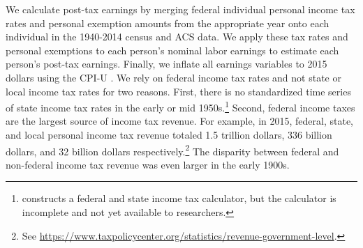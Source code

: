 \documentclass[12pt]{article}
\begin{document}
We calculate post-tax earnings by merging federal individual personal income tax rates  and personal exemption amounts  from the appropriate year onto each individual in the 1940-2014 census and ACS data. 
We apply these tax rates and personal exemptions to each person's nominal labor earnings to estimate each person's post-tax earnings. 
Finally, we inflate all earnings variables to 2015 dollars using the CPI-U . 
We rely on federal income tax rates and not state or local income tax rates for two reasons. 
First, there is no standardized time series of state income tax rates in the early or mid 1950s.\footnote{ constructs a federal and state income tax calculator, but the calculator is incomplete and not yet available to researchers.} 
Second, federal income taxes are the largest source of income tax revenue. 
For example, in 2015, federal, state, and local personal income tax revenue totaled 1.5 trillion dollars, 336 billion dollars, and 32 billion dollars respectively.\footnote{See \href{https://www.taxpolicycenter.org/statistics/revenue-government-level}{https://www.taxpolicycenter.org/statistics/revenue-government-level}.} 
The disparity between federal and non-federal income tax revenue was even larger in the early 1900s.
\end{document}
